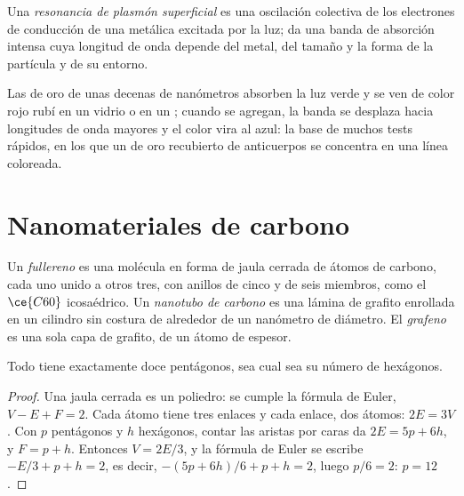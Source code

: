 \begin{definition}\label{def:b3:inorganic-materials:plasmon}
Una \emph{resonancia de plasmón superficial} es una
oscilación colectiva de los electrones de conducción de una  metálica
excitada por la luz; da una banda de absorción intensa cuya longitud de onda depende
del metal, del tamaño y la forma de la partícula y de su entorno.
\end{definition}

Las  de oro de unas decenas de nanómetros absorben la luz verde y se ven
de color rojo rubí en un vidrio o en un ; cuando se agregan, la banda se desplaza hacia longitudes
de onda mayores y el color vira al azul: la base de muchos tests rápidos, en los que
un  de oro recubierto de anticuerpos se concentra en una línea coloreada.

\section{Nanomateriales de carbono}

\begin{definition}\label{def:b3:inorganic-materials:carbon}
Un \emph{fullereno} es una molécula en forma de jaula cerrada de átomos de carbono,
cada uno unido a otros tres, con anillos de cinco y de seis miembros, como el
$\ce{C60}$ icosaédrico. Un \emph{nanotubo de carbono} es una lámina de
grafito enrollada en un cilindro sin costura de alrededor de un nanómetro de diámetro.
El \emph{grafeno} es una sola capa de grafito, de un átomo de espesor.
\end{definition}

\begin{proposition}\label{prop:b3:inorganic-materials:euler}
Todo  tiene exactamente doce pentágonos, sea cual sea su número de
hexágonos.
\end{proposition}

\begin{proof}
Una jaula cerrada es un poliedro: se cumple la fórmula de Euler, $V - E + F = 2$. Cada átomo tiene
tres enlaces y cada enlace, dos átomos: $2E = 3V$. Con $p$ pentágonos y $h$ hexágonos,
contar las aristas por caras da $2E = 5p + 6h$, y $F = p + h$. Entonces $V = 2E/3$, y la fórmula de
Euler se escribe $-E/3 + p + h = 2$, es decir, $-(5p + 6h)/6 + p + h = 2$, luego $p/6 = 2$: $p = 12$.
\end{proof}

